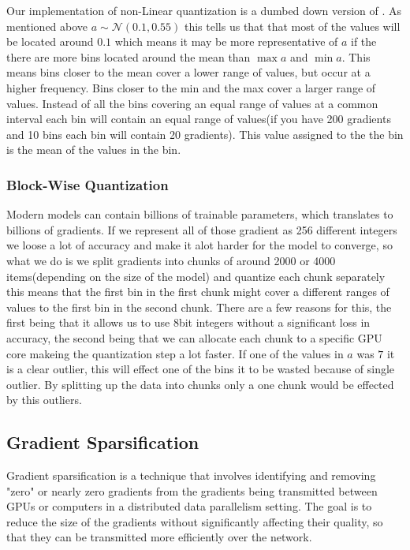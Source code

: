 \documentclass[twocolumn,10pt]{article}
\begin{document}
Our implementation of non-Linear quantization is a dumbed down version of \cite{dettmers20218}. As mentioned above $a \sim \mathcal{N}(0.1,0.55)$ this tells us that that most of the values will be located around $0.1$ which means it may be more representative of $a$ if the there are more bins located around the mean than $\max a$ and $\min a$. This means bins closer to the mean cover a lower range of values, but occur at a higher frequency. Bins closer to the min and the max cover a larger range of values. Instead of all the bins covering an equal range of values at a common interval each bin will contain an equal range of values(if you have 200 gradients and 10 bins each bin will contain 20 gradients). This value assigned to the the bin is the mean of the values in the bin.

\subsubsection{Block-Wise Quantization}

Modern models can contain billions of trainable parameters, which translates to billions of gradients. If we represent all of those gradient as 256 different integers we loose a lot of accuracy and make it alot harder for the model to converge, so what we do is we split gradients into chunks of around 2000 or 4000 items(depending on the size of the model) and quantize each chunk separately this means that the first bin in the first chunk might cover a different ranges of values to the first bin in the second chunk. There are a few reasons for this, the first being that it allows us to use 8bit integers without a significant loss in accuracy, the second being that we can allocate each chunk to a specific GPU core makeing the quantization step a lot faster. If one of the values in $a$ was $7$ it is a clear outlier, this will effect one of the bins it to be wasted because of single outlier. By splitting up the data into chunks only a one chunk would be effected by this outliers.


\subsection{Gradient Sparsification}
Gradient sparsification is a technique that involves identifying and removing "zero" or nearly zero gradients \cite{NEURIPS2018_3328bdf9} from the gradients being transmitted between GPUs or computers in a distributed data parallelism setting. The goal is to reduce the size of the gradients without significantly affecting their quality, so that they can be transmitted more efficiently over the network.
\end{document}
